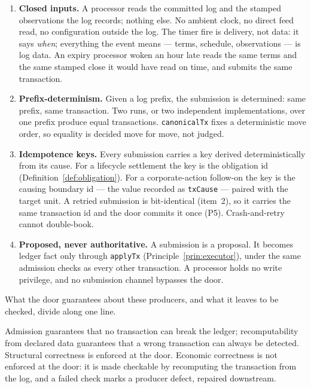 \begin{enumerate}[nosep]
\item \textbf{Closed inputs.} A processor reads the committed log and the stamped observations the log records; nothing else. No ambient clock, no direct feed read, no configuration outside the log. The timer fire is delivery, not data: it says \emph{when}; everything the event means --- terms, schedule, observations --- is log data. An expiry processor woken an hour late reads the same terms and the same stamped close it would have read on time, and submits the same transaction.

\item \textbf{Prefix-determinism.} Given a log prefix, the submission is determined: same prefix, same transaction. Two runs, or two independent implementations, over one prefix produce equal transactions. \texttt{canonicalTx} fixes a deterministic move order, so equality is decided move for move, not judged.

\item \textbf{Idempotence keys.} Every submission carries a key derived deterministically from its cause. For a lifecycle settlement the key is the obligation id (Definition~\ref{def:obligation}). For a corporate-action follow-on the key is the causing boundary id --- the value recorded as \texttt{txCause} --- paired with the target unit. A retried submission is bit-identical (item~2), so it carries the same transaction id and the door commits it once (P5). Crash-and-retry cannot double-book.

\item \textbf{Proposed, never authoritative.} A submission is a proposal. It becomes ledger fact only through \texttt{applyTx} (Principle~\ref{prin:executor}), under the same admission checks as every other transaction. A processor holds no write privilege, and no submission channel bypasses the door.
\end{enumerate}

\noindent What the door guarantees about these producers, and what it leaves to be checked, divide along one line.

\begin{principle}
\label{prin:admission-recomputation}
Admission guarantees that no transaction can break the ledger; recomputability from declared data guarantees that a wrong transaction can always be detected. Structural correctness is enforced at the door. Economic correctness is not enforced at the door: it is made checkable by recomputing the transaction from the log, and a failed check marks a producer defect, repaired downstream.
\end{principle}

